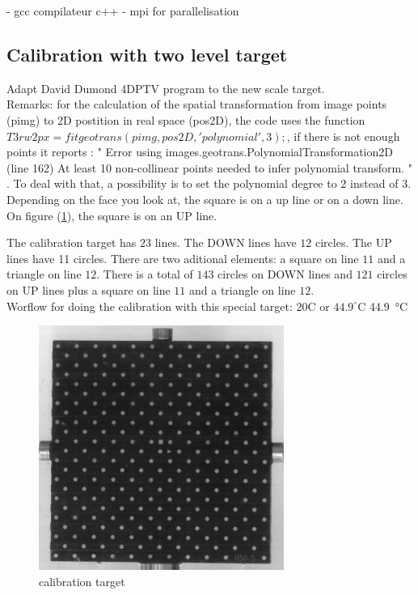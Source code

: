 \documentclass[twocolumn,amsmath,amssymb,floatfix]{revtex4}
\begin{document}
- gcc compilateur c++
- mpi for parallelisation

\subsection{Calibration with two level target}

Adapt David Dumond 4DPTV program to the new scale target.\\

Remarks: for the calculation of the spatial transformation from image points (pimg) to 2D postition in real space (pos2D), the code uses the function $T3rw2px  = fitgeotrans(pimg,pos2D,'polynomial',3);$, if there is not enough points it reports : " Error using images.geotrans.PolynomialTransformation2D (line 162)
At least 10 non-collinear points needed to infer polynomial transform. " . To deal with that, a possibility is to set the polynomial degree to $2$ instead of $3$.\\

Depending on the face you look at, the square is on a up line or on a down line. On figure (\ref{fig:caltarget}), the square is on an UP line.

The calibration target has $23$ lines. The DOWN lines have $12$ circles. The UP lines have 11 circles. There are two aditional elements: a square on line $11$ and a triangle on line $12$. There is a total of $143$ circles on DOWN lines and $121$ circles on UP lines plus a square on line $11$ and a triangle on line $12$. \\

Worflow for doing the calibration with this special target: $20$\textdegree{}C or $44.9^\circ$C \SI{44.9}{\celsius}

\begin{figure}
\includegraphics[height=8cm]{figures/calibrationTarget.png}
\caption{calibration target}
\label{fig:caltarget}
\end{figure}
\end{document}

